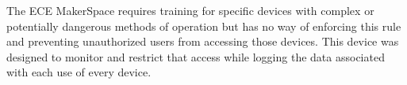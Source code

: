 The ECE MakerSpace requires training for specific devices with complex or potentially dangerous methods of operation but has no way of enforcing this rule and preventing unauthorized users from accessing those devices. This device was designed to monitor and restrict that access while logging the data associated with each use of every device.